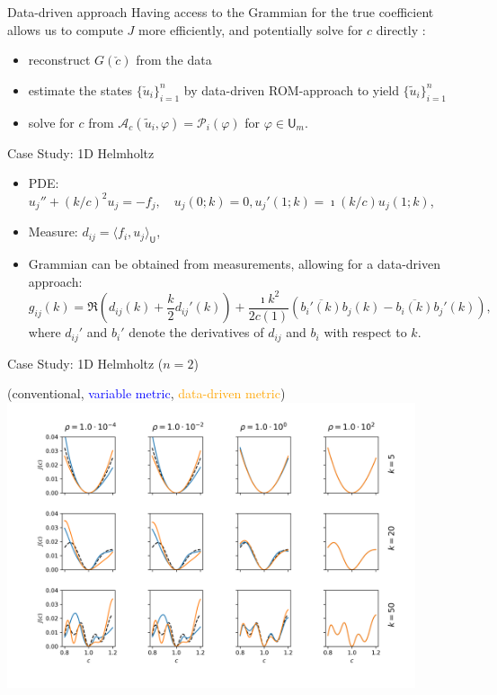 \documentclass{beamer}
\newcommand{\sU}{\mathsf{U}}
\newcommand{\mA}{\mathcal{A}}
\newcommand{\mP}{\mathcal{P}}
\begin{document}
\begin{frame}{Data-driven approach}
Having access to the Grammian for the true coefficient allows us to compute $J$ more efficiently, and potentially solve for $c$ directly \cite{borcea2022waveform}:
\begin{itemize}
  \item reconstruct $G(\check{c})$ from the data
  \item estimate the states $\{\check{u}_i\}_{i=1}^n$ by data-driven ROM-approach to yield $\{\widetilde{u}_i\}_{i=1}^n$ 
  \item solve for $c$ from $\mA_c(\widetilde{u}_i,\varphi)=\mP_i(\varphi)$ for $\varphi\in \sU_m$.
\end{itemize}
\end{frame}


\begin{frame}{Case Study: 1D Helmholtz}
\begin{itemize}
  \item PDE: $u_j'' + (k/c)^2 u_j = -f_j, \quad u_j(0;k) = 0, u_j'(1;k)=\imath (k/c)u_j(1;k)$,
  \item Measure: $d_{ij} = \langle f_i, u_j\rangle_\sU$,
  \item Grammian can be obtained from measurements, allowing for a data-driven approach: $$ g_{ij}(k) = \Re\left(d_{ij}(k) + {\textstyle\frac{k}{2}}d_{ij}'(k)\right) + {\textstyle\frac{\imath k^2}{2c(1)}}\left(\overline{b_i'(k)}b_j(k) - \overline{b_i(k)}b_j'(k)\right),
$$
where $d_{ij}'$ and $b_i'$ denote the derivatives of $d_{ij}$ and $b_i$ with respect to $k$. 
\end{itemize}
\end{frame}

\begin{frame}{Case Study: 1D Helmholtz ($n=2$)}
  \begin{center}
(conventional, \textcolor{blue}{variable metric}, \textcolor{orange}{data-driven metric})
\includegraphics[width=0.9\textwidth]{../paper/figures/Helmholtz1D_2.png}
  \end{center}
\end{frame}
\end{document}
